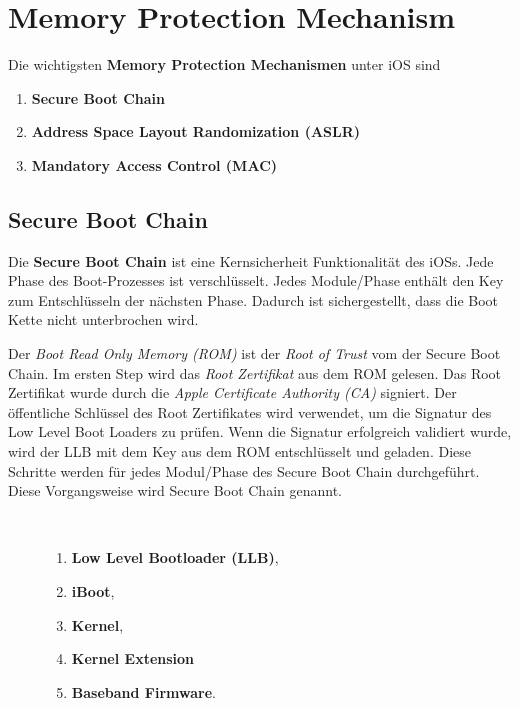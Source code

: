 \section{Memory Protection Mechanism}
\label{sec:MemoryProtection}
Die wichtigsten \textbf{Memory Protection Mechanismen} unter iOS sind
\begin{enumerate}
    \item \textbf{Secure Boot Chain}
    \item \textbf{Address Space Layout Randomization (ASLR)}
    \item \textbf{Mandatory Access Control (MAC)}
\end{enumerate}

\subsection{Secure Boot Chain}
\label{sec:SecBootChain}

Die \textbf{Secure Boot Chain} ist eine Kernsicherheit Funktionalität des iOSs. Jede Phase des Boot-Prozesses ist verschlüsselt. Jedes Module/Phase enthält den Key zum Entschlüsseln der nächsten Phase. Dadurch ist sichergestellt, dass die Boot Kette nicht unterbrochen wird. \par

Der \textit{\glqq Boot Read Only Memory (ROM)\grqq{}} ist der \textit{\glqq Root of Trust\grqq{}} vom der Secure Boot Chain. Im ersten Step wird das \textit{\glqq Root Zertifikat\grqq{}} aus dem ROM gelesen. Das Root Zertifikat wurde durch die \textit{\glqq Apple Certificate Authority (CA)\grqq{}} signiert. Der öffentliche Schlüssel des Root Zertifikates wird verwendet, um die Signatur des Low Level Boot Loaders zu prüfen. Wenn die Signatur erfolgreich validiert wurde, wird der LLB mit dem Key aus dem ROM entschlüsselt und geladen. Diese Schritte werden für jedes Modul/Phase des Secure Boot Chain durchgeführt. Diese Vorgangsweise  wird Secure Boot Chain genannt.

\begin{description}
    \item[\parbox{\textwidth}{Die Secure Boot Chain beinhaltet folgende Module/Phasen}]~\par
   \begin{enumerate}
        \item \textbf{Low Level Bootloader (LLB)},
        \item \textbf{iBoot},
        \item \textbf{Kernel},
        \item \textbf{Kernel Extension}
        \item \textbf{Baseband Firmware}.
    \end{enumerate}
\end{description} 

